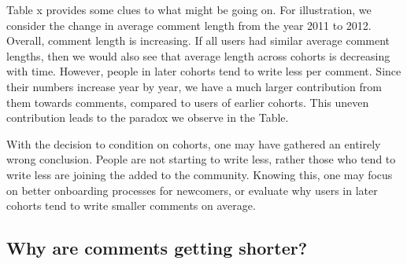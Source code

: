 Table x provides some clues to what might be going on. For illustration, we consider the change in average comment length from the year 2011 to 2012. Overall, comment length is increasing. If all users had similar average comment lengths, then we would also see that average length across cohorts is decreasing with time. However, people in later cohorts tend to write less per comment. Since their numbers increase year by year, we have a  much larger contribution from them towards comments, compared to users of earlier cohorts. This uneven contribution leads to the paradox we observe in the Table. 

With the decision to condition on cohorts, one may have gathered an entirely wrong conclusion. People  are not starting to write less, rather those who tend to write less are joining the  added to the community. Knowing this, one may focus on better onboarding processes for newcomers, or evaluate why users in later cohorts tend to write smaller comments on average. 

\subsection{Why are comments getting shorter?}

